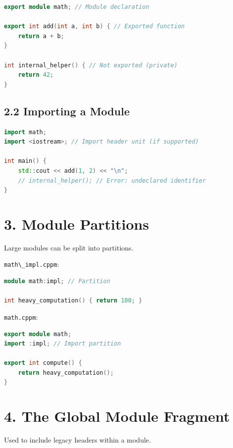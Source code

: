 \begin{lstlisting}[language={C++}]
export module math; // Module declaration

export int add(int a, int b) { // Exported function
    return a + b;
}

int internal_helper() { // Not exported (private)
    return 42;
}
\end{lstlisting}

\hypertarget{importing-a-module}{%
\subsection{2.2 Importing a Module}\label{importing-a-module}}

\begin{lstlisting}[language={C++}]
import math;
import <iostream>; // Import header unit (if supported)

int main() {
    std::cout << add(1, 2) << "\n";
    // internal_helper(); // Error: undeclared identifier
}
\end{lstlisting}

\hypertarget{module-partitions}{%
\section{3. Module Partitions}\label{module-partitions}}

Large modules can be split into partitions.

\passthrough{\lstinline!math\_impl.cppm!}:

\begin{lstlisting}[language={C++}]
module math:impl; // Partition

int heavy_computation() { return 100; }
\end{lstlisting}

\passthrough{\lstinline!math.cppm!}:

\begin{lstlisting}[language={C++}]
export module math;
import :impl; // Import partition

export int compute() {
    return heavy_computation();
}
\end{lstlisting}

\hypertarget{the-global-module-fragment}{%
\section{4. The Global Module
Fragment}\label{the-global-module-fragment}}

Used to include legacy headers within a module.

